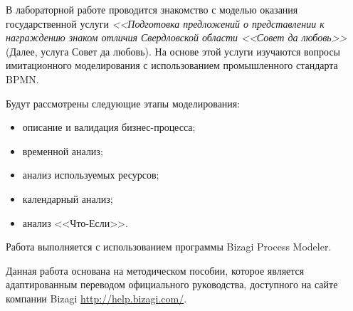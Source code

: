 \Introduction

В лабораторной работе проводится знакомство с моделью оказания
государственной услуги \textit{<<Подготовка предложений о представлении
к награждению знаком отличия Свердловской области <<Совет да любовь>>}
(Далее, услуга Совет да любовь). На основе этой услуги
изучаются вопросы имитационного моделирования с использованием
промышленного стандарта BPMN.

Будут рассмотрены следующие этапы моделирования:

\begin{itemize}
    \item описание и валидация бизнес-процесса;
    \item временной анализ;
    \item анализ используемых ресурсов;
    \item календарный анализ;
    \item анализ <<Что-Если>>.
\end{itemize}

Работа выполняется с использованием программы Bizagi Process
Modeler.

Данная работа основана на методическом пособии\cite{method},
которое является адаптированным переводом официального руководства,
доступного на сайте компании Bizagi
\url{http://help.bizagi.com/}\cite{help}.
